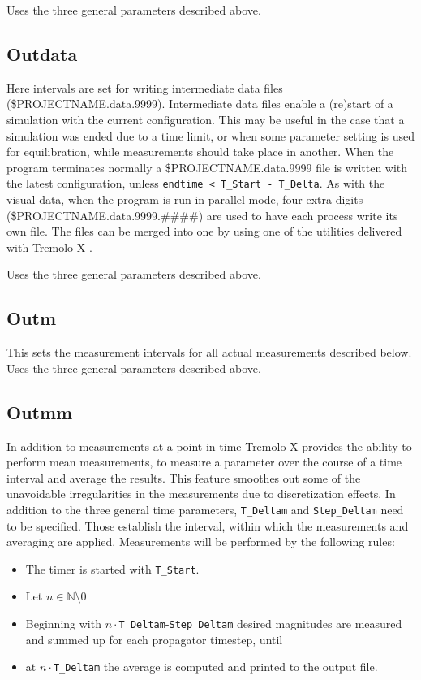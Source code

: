 Uses the three general parameters described above.

\subsection{Outdata}
Here intervals are set for writing intermediate data files (\$PROJECTNAME.data.9999). Intermediate data files enable a (re)start of a simulation with the current configuration. 
This may be useful in the case that a simulation was ended due to a time limit, or when some parameter setting is used for equilibration, while measurements should take place in another.
When the program terminates normally a \$PROJECTNAME.data.9999 file is written with the latest configuration, unless {\tt endtime < T\_Start - T\_Delta}. 
As with the visual data, when the program is run in parallel mode, four extra digits (\$PROJECTNAME.data.9999.\#\#\#\#) are used to have each process write its own file. The files can be merged into one by using one of the utilities delivered with Tremolo-X .

Uses the three general parameters described above.
\subsection{Outm}
This sets the measurement intervals for all actual measurements described below. Uses the three general parameters described above.
\subsection{Outmm}
In addition to measurements at a point in time Tremolo-X provides the ability to perform mean measurements, 
to measure a parameter over the course of a time interval and average the results.
This feature smoothes out some of the unavoidable irregularities in the measurements due to discretization effects.
In addition to the three general time parameters, {\tt T\_Deltam} and {\tt Step\_Deltam} need to be specified. Those establish the interval, within which the measurements and averaging 
are applied. Measurements will be performed by the following rules:
\begin{itemize}
\item The timer is started with {\tt T\_Start}.
\item Let {\tt$n \in \mathbb{N}\setminus 0$}
\item Beginning with {\tt $n \cdot$T\_Deltam}-{\tt Step\_Deltam} desired magnitudes are measured and summed up for each propagator timestep, until
\item at {\tt $n\cdot$T\_Deltam} the average is computed and printed to the output file.
\end{itemize}

